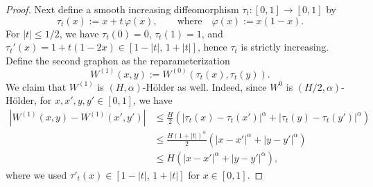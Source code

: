 \documentclass[11pt]{article}
\newcommand{\<}{\langle}
\renewcommand{\>}{\rangle}
\theoremstyle{plain}
\theoremstyle{definition}
\theoremstyle{remark}
\begin{document}
{\begin{proof}
	Next define a smooth increasing diffeomorphism $\tau_t:[0,1]\to[0,1]$ by
	\[
	\tau_t(x) := x + t\,\varphi(x),
	\qquad \text{where}\quad \varphi(x):=x(1-x).
	\]
	For $|t|\le 1/2$, we have $\tau_t(0)=0$, $\tau_t(1)=1$, and
	$\tau_t'(x)=1+t(1-2x)\in[1-|t|,\,1+|t|]$, hence $\tau_t$ is strictly increasing.
	Define the second graphon as the reparameterization
	\[
	W^{(1)}(x,y) := W^{(0)}(\tau_t(x),\tau_t(y)).
	\]
    We claim that $W^{(1)}$ is $(H, \alpha)$-H\"older as well. Indeed, since $W^{0}$ is $(H/2, \alpha)$-H\"older, for $x,x',y,y'\in[0,1]$, we have
    \begin{align*}
        |W^{(1)}(x,y) - W^{(1)}(x',y')| & \le \frac{H}{2}  \left (|\tau_t(x) - \tau_t(x')|^\alpha + |\tau_t(y) - \tau_t(y')|^\alpha \right ) \\
        & \le \frac{H (1 + |t|)^\alpha}{2}  \left (|x - x'|^\alpha + |y - y'|^\alpha \right ) \\
         & \le H  \left (|x - x'|^\alpha + |y - y'|^\alpha \right ),
    \end{align*}
    where we used $\tau'_t(x)\in[1-|t|,\,1+|t|]$ for $x\in[0,1]$.
  

\end{proof}}
\end{document}
